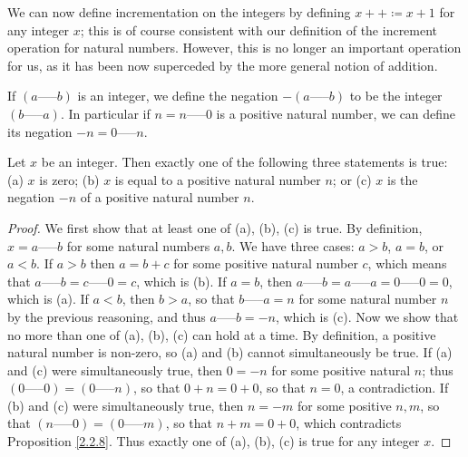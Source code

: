 We can now define incrementation on the integers by defining \(x++ \coloneqq x + 1\) for any integer \(x\);
this is of course consistent with our definition of the increment operation for natural numbers.
However, this is no longer an important operation for us, as it has been now superceded by the more general notion of addition.

\begin{definition}\label{definition 4.1.3}
If \((a \text{-----} b)\) is an integer, we define the negation \(-(a \text{-----} b)\) to be the integer \((b \text{-----} a)\).
In particular if \(n = n \text{-----} 0\) is a positive natural number, we can define its negation \(-n = 0 \text{-----} n\).
\end{definition}

\begin{lemma}\label{lemma 4.1.3}
Let \(x\) be an integer.
Then exactly one of the following three statements is true:
(a) \(x\) is zero;
(b) \(x\) is equal to a positive natural number \(n\);
or (c) \(x\) is the negation \(-n\) of a positive natural number \(n\).
\end{lemma}

\begin{proof}
We first show that at least one of (a), (b), (c) is true.
By definition, \(x = a \text{-----} b\) for some natural numbers \(a, b\).
We have three cases: \(a > b\), \(a = b\), or \(a < b\).
If \(a > b\) then \(a = b + c \) for some positive natural number \(c\), which means that \(a \text{-----} b = c \text{-----} 0 = c\), which is (b).
If \(a = b\), then \(a \text{-----} b = a \text{-----} a = 0 \text{-----} 0 = 0\), which is (a).
If \(a < b\), then \(b > a\), so that \(b \text{-----} a = n\) for some natural number \(n\) by the previous reasoning, and thus \(a \text{-----} b = -n\), which is (c).
Now we show that no more than one of (a), (b), (c) can hold at a time.
By definition, a positive natural number is non-zero, so (a) and (b) cannot simultaneously be true.
If (a) and (c) were simultaneously true, then \(0 = -n\) for some positive natural \(n\);
thus \((0 \text{-----} 0) = (0 \text{-----} n)\), so that \(0 + n = 0 + 0\), so that \(n = 0\), a contradiction.
If (b) and (c) were simultaneously true, then \(n = -m\) for some positive \(n, m\), so that \((n \text{-----} 0) = (0 \text{-----} m)\), so that \(n + m = 0 + 0\), which contradicts Proposition \ref{2.2.8}.
Thus exactly one of (a), (b), (c) is true for any integer \(x\).
\end{proof}

